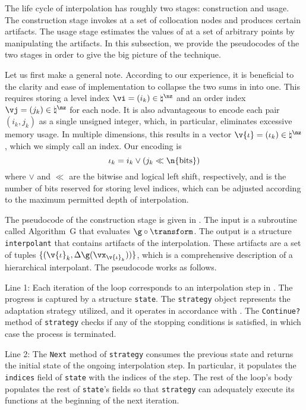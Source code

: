 The life cycle of interpolation has roughly two stages: construction and usage.
The construction stage invokes \g at a set of collocation nodes and produces
certain artifacts. The usage stage estimates the values of \g at a set of
arbitrary points by manipulating the artifacts. In this subsection, we provide
the pseudocodes of the two stages in order to give the big picture of the
technique.

Let us first make a general note. According to our experience, it is beneficial
to the clarity and ease of implementation to collapse the two sums in
 into one. This requires storing a level index $\vi = (i_k)
\in \natural^\nz$ and an order index $\vj = (j_k) \in \natural^\nz$ for each
node. It is also advantageous to encode each pair $(i_k, j_k)$ as a single
unsigned integer, which, in particular, eliminates excessive memory usage. In
multiple dimensions, this results in a vector $\v{\iota} = (\iota_k) \in
\natural^\nz$, which we simply call an index. Our encoding is
\[
  \iota_k = i_k \lor (j_k \ll \n{\mathrm{bits}})
\]
where $\lor$ and $\ll$ are the bitwise  and logical left shift,
respectively, and  is the number of bits reserved for storing
level indices, which can be adjusted according to the maximum permitted depth of
interpolation.

The pseudocode of the construction stage is given in .
The input is a subroutine called Algorithm~G that evaluates $\g \circ
\transform$. The output is a structure \texttt{interpolant} that contains
artifacts of the interpolation. These artifacts are a set of tuples $\{
(\v{\iota}_k, \Delta\g(\vx_{\v{\iota}_k})) \}$, which is a comprehensive
description of a hierarchical interpolant. The pseudocode works as follows.

Line 1: Each iteration of the loop corresponds to an interpolation step \ls in
. The progress is captured by a structure \texttt{state}. The
\texttt{strategy} object represents the adaptation strategy utilized, and it
operates in accordance with . The \texttt{Continue?}
method of \texttt{strategy} checks if any of the stopping conditions is
satisfied, in which case the process is terminated.

Line 2: The \texttt{Next} method of \texttt{strategy} consumes the previous
state and returns the initial state of the ongoing interpolation step. In
particular, it populates the \texttt{indices} field of \texttt{state} with the
indices of the step. The rest of the loop's body populates the rest of
\texttt{state}'s fields so that \texttt{strategy} can adequately execute its
functions at the beginning of the next iteration.

